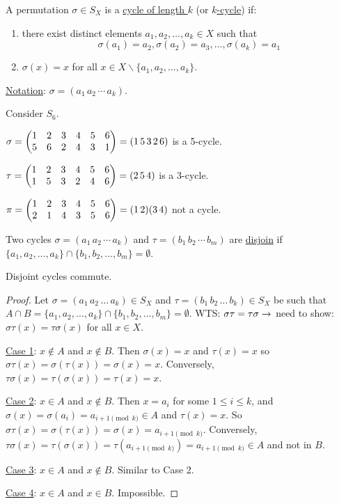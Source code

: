 \documentclass[]{article}
\begin{document}
\begin{definition}
	A permutation $\sigma\in S_X$ is a \ul{cycle of length $k$} (or \ul{$k$-cycle}) if:
	\begin{enumerate}
		\item there exist distinct elements $a_1,a_2,\dots,a_k\in X$ such that 
			$$\sigma(a_1) = a_2, \sigma(a_2) = a_3,\dots,\sigma(a_k) = a_1$$
		\item $\sigma(x) = x$ for all $x\in X\backslash\{a_1,a_2,\dots,a_k\}$.
	\end{enumerate}
	\ul{Notation}: $\sigma = (a_1\,a_2\,\cdots\,a_k)$.
\end{definition}
\begin{example}
	Consider $S_6$.

	$\sigma = \begin{pmatrix}1&2&3&4&5&6\\5&6&2&4&3&1\end{pmatrix} = (1\,5\,3\,2\,6)$ is a 5-cycle. 
	
	$\tau = \begin{pmatrix}1&2&3&4&5&6\\1&5&3&2&4&6\end{pmatrix} = (2\,5\,4)$ is a 3-cycle.

	$\pi = \begin{pmatrix}1&2&3&4&5&6\\2&1&4&3&5&6\end{pmatrix} = (1\,2)(3\,4)$ not a cycle.
\end{example}

\begin{definition}
	Two cycles $\sigma = (a_1\, a_2\,\cdots\, a_k)$ and $\tau = (b_1\,b_2\,\cdots\,b_m)$ are \ul{disjoin} if $\{a_1,a_2,\dots,a_k\}\cap \{b_1,b_2,\dots,b_m\} = \emptyset$.
\end{definition}

\begin{proposition}
	Disjoint cycles commute.
\end{proposition}
\begin{proof}
	Let $\sigma = (a_1\,a_2\,\dots\,a_k)\in S_X$ and $\tau = (b_1\,b_2\,\dots\,b_k)\in S_X$ be such that $A\cap B = \{a_1,a_2,\dots,a_k\}\cap \{b_1,b_2,\dots,b_m\} = \emptyset$.
	WTS: $\sigma\tau = \tau\sigma \rightarrow$ need to show: $\sigma\tau(x) = \tau\sigma(x)$ for all $x\in X$.

	\ul{Case 1}: $x\notin A$ and $x\notin B$. Then $\sigma(x) = x$ and $\tau(x) = x$ so $\sigma\tau(x) = \sigma(\tau(x)) = \sigma(x) = x$. Conversely, $\tau\sigma(x) = \tau(\sigma(x)) = \tau(x) = x$.

	\ul{Case 2}: $x\in A$ and $x\notin B$. Then $x = a_i$ for some $1\leq i\leq k$, and $\sigma(x) = \sigma(a_i) = a_{i+1\pmod k}\in A$ and $\tau(x) = x$. So $\sigma\tau(x) = \sigma(\tau(x)) = \sigma(x) = a_{i+1\pmod k}$. Conversely, $\tau\sigma(x) = \tau(\sigma(x)) = \tau(a_{i+1\pmod k}) = a_{i+1\pmod k}\in A$ and not in $B$.

	\ul{Case 3}: $x\in A$ and $x\notin B$. Similar to Case 2.

	\ul{Case 4}: $x\in A$ and $x\in B$. Impossible.
\end{proof}
\end{document}
